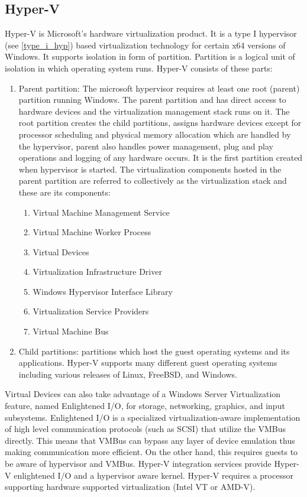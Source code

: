 \subsection{Hyper-V}
Hyper-V is Microsoft's hardware virtualization product. It is a type I hypervisor (see \ref{type_i_hyp}) based virtualization technology for certain x64 versions of Windows. It supports isolation in form of partition. Partition is a logical unit of isolation in which operating system runs. 
Hyper-V consists of these parts:
\begin{enumerate}
\item Parent partition: The microsoft hypervisor requires at least one root (parent) partition running Windows. The parent partition and has direct access to hardware devices and the virtualization management stack runs on it. The root partition creates the child partitions, assigns hardware devices except for processor scheduling and physical memory allocation which are handled by the hypervisor, parent also handles power management, plug and play operations and logging of any hardware occurs. It is the first partition created when hypervisor is started. The virtualization components hosted in the parent partition are referred to collectively as the virtualization stack and these are its components:
\begin{enumerate}
\item Virtual Machine Management Service
\item Virtual Machine Worker Process
\item Virtual Devices
\item Virtualization Infrastructure Driver
\item Windows Hypervisor Interface Library
\item Virtualization Service Providers
\item Virtual Machine Bus
\end{enumerate}
\item Child partitions: partitions which host the guest operating systems and its applications. Hyper-V supports many different guest operating systems including various releases of Linux, FreeBSD, and Windows.
\end{enumerate}
Virtual Devices can also take advantage of a Windows Server Virtualization feature, named Enlightened I/O, for storage, networking, graphics, and input subsystems. Enlightened I/O is a specialized virtualization-aware implementation of high level communication protocols (such as SCSI) that utilize the VMBus directly. This means that VMBus can bypass any layer of device emulation thus making communication more efficient. On the other hand, this requires guests to be aware of hypervisor and VMBus. Hyper-V integration services provide Hyper-V enlightened I/O and a hypervisor aware kernel. Hyper-V requires a processor supporting hardware supported virtualization (Intel VT or AMD-V).
